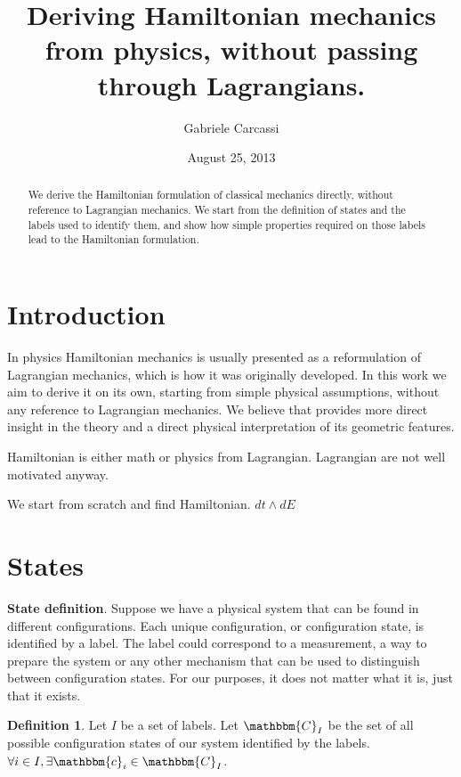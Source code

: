 \documentclass[twocolumn,floatfix,nofootinbib]{revtex4}   %
\theoremstyle{theorem}
\theoremstyle{definition}
\newtheorem{defn}[thm]{Definition}
\begin{document}
\title{Deriving Hamiltonian mechanics from physics, without passing through Lagrangians.}
\author{Gabriele Carcassi}
\date{August 25, 2013}

\begin{abstract}
We derive the Hamiltonian formulation of classical mechanics directly, without reference to Lagrangian mechanics.
We start from the definition of states and the labels used to identify them, and show how simple properties required
on those labels lead to the Hamiltonian formulation.\end{abstract}

\maketitle

\section{Introduction}
In physics Hamiltonian mechanics is usually presented as a reformulation of Lagrangian mechanics, which is how it was originally developed. In this work we aim to derive it on its own, starting from simple physical assumptions, without any reference to Lagrangian mechanics. We believe that provides more direct insight in the theory and a direct physical interpretation of its geometric features.



Hamiltonian is either math or physics from Lagrangian. Lagrangian are not well motivated anyway.

We start from scratch and find Hamiltonian. $dt \wedge dE$

\section{States}
\textbf{State definition}. Suppose we have a physical system that can be found in different configurations. Each unique configuration, or configuration state, is identified by a label. The label could correspond to a measurement, a way to prepare the system or any other mechanism that can be used to distinguish between configuration states. For our purposes, it does not matter what it is, just that it exists.

\begin{defn}\label{statedef}
Let $I$ be a set of labels. Let $\mathbbm{C}_{I}$ be the set of all possible configuration states of our system identified by the labels. $\forall i \in I, \exists \mathbbm{c}_{i} \in \mathbbm{C}_{I}$.
\end{defn}
\end{document}
